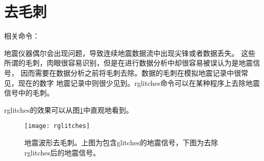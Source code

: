 \section{去毛刺}
相关命令：

地震仪器偶尔会出现问题，导致连续地震数据流中出现尖锋或者数据丢失。
这些所谓的毛刺，肉眼很容易识别，但是在进行数据分析中却很容易被误认为是地震信号，
因而需要在数据分析之前将毛刺去除。数据的毛刺在模拟地震记录中很常见，现在的数字
地震记录中则很少见到。rglitches命令可以在某种程序上去除地震信号中的毛刺。

rglitches的效果可以从图\ref{fig:deglitches}中直观地看到。

\begin{figure}[H]
\centering
\texttt{[image: rglitches]}
\caption[地震波形去毛刺]{地震波形去毛刺。上图为包含glitches的地震信号，下图为去除
rglitches后的地震信号。}
\label{fig:deglitches}
\end{figure}
